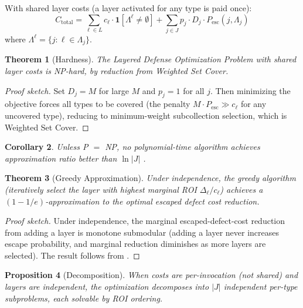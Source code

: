 \documentclass[11pt, a4paper]{article}
\newtheorem{theorem}{Theorem}[section]
\newtheorem{proposition}[theorem]{Proposition}
\newtheorem{corollary}[theorem]{Corollary}
\theoremstyle{definition}
\theoremstyle{remark}
\newcommand{\Pesc}{P_{\mathrm{esc}}}
\begin{document}
With shared layer costs (a layer activated for any type is paid once):
\begin{equation}
\label{eq:objective}
C_{\mathrm{total}} = \sum_{\ell \in L} c_\ell \cdot \mathbf{1}[\Lambda^\ell \neq \emptyset] + \sum_{j \in J} p_j \cdot D_j \cdot \Pesc(j, \Lambda_j)
\end{equation}
where $\Lambda^\ell = \{j : \ell \in \Lambda_j\}$.

\begin{theorem}[Hardness]
\label{thm:nphard}
The Layered Defense Optimization Problem with shared layer costs is NP-hard, by reduction from Weighted Set Cover.
\end{theorem}

\begin{proof}[Proof sketch]
Set $D_j = M$ for large $M$ and $p_j = 1$ for all $j$. Then minimizing the objective forces all types to be covered (the penalty $M \cdot \Pesc \gg c_\ell$ for any uncovered type), reducing to minimum-weight subcollection selection, which is Weighted Set Cover.
\end{proof}

\begin{corollary}
\label{cor:inapprox}
Unless P $=$ NP, no polynomial-time algorithm achieves approximation ratio better than $\ln|J|$ \citep{dinur2014}.
\end{corollary}

\begin{theorem}[Greedy Approximation]
\label{thm:greedy}
Under independence, the greedy algorithm (iteratively select the layer with highest marginal ROI $\Delta_\ell / c_\ell$) achieves a $(1-1/e)$-approximation to the optimal escaped defect cost reduction.
\end{theorem}

\begin{proof}[Proof sketch]
Under independence, the marginal escaped-defect-cost reduction from adding a layer is monotone submodular (adding a layer never increases escape probability, and marginal reduction diminishes as more layers are selected). The result follows from \citet{nemhauser1978}.
\end{proof}

\begin{proposition}[Decomposition]
\label{prop:decomp}
When costs are per-invocation (not shared) and layers are independent, the optimization decomposes into $|J|$ independent per-type subproblems, each solvable by ROI ordering.
\end{proposition}
\end{document}
